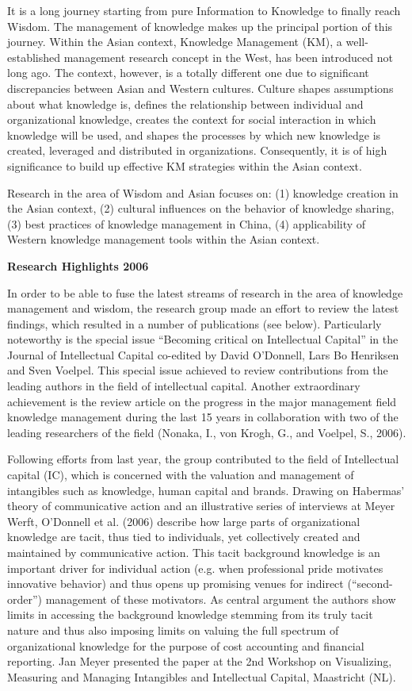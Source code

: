  It is a long journey starting from pure Information to Knowledge to finally reach Wisdom. The management of knowledge makes up the principal portion of this journey. Within the Asian context, Knowledge Management (KM), a well-established management research concept in the West, has been introduced not long ago. The context, however, is a totally different one due to significant discrepancies between Asian and Western cultures. Culture shapes assumptions about what knowledge is, defines the relationship between individual and organizational knowledge, creates the context for social interaction in which knowledge will be used, and shapes the processes by which new knowledge is created, leveraged and distributed in organizations. Consequently, it is of high significance to build up effective KM strategies within the Asian context.

 Research in the area of Wisdom and Asian focuses on: (1) knowledge creation in the Asian context, (2) cultural influences on the behavior of knowledge sharing, (3) best practices of knowledge management in China, (4) applicability of Western knowledge management tools within the Asian context.

\null
\textbf{Research Highlights 2006}

 In order to be able to fuse the latest streams of research in the area of knowledge management and wisdom, the research group made an effort to review the latest findings, which resulted in a number of publications (see below). Particularly noteworthy is the special issue ``Becoming critical on Intellectual Capital'' in the Journal of Intellectual Capital co-edited by David O'Donnell, Lars Bo Henriksen and Sven Voelpel. This special issue achieved to review contributions from the leading authors in the field of intellectual capital. Another extraordinary achievement is the review article on the progress in the major management field knowledge management during the last 15 years in collaboration with two of the leading researchers of the field (Nonaka, I., von Krogh, G., and Voelpel, S., 2006).

 Following efforts from last year, the group contributed to the field of Intellectual capital (IC), which is concerned with the valuation and management of intangibles such as knowledge, human capital and brands. Drawing on Habermas' theory of communicative action and an illustrative series of interviews at Meyer Werft, O'Donnell et al. (2006) describe how large parts of organizational knowledge are tacit, thus tied to individuals, yet collectively created and maintained by communicative action. This tacit background knowledge is an important driver for individual action (e.g. when professional pride motivates innovative behavior) and thus opens up promising venues for indirect (``second-order'') management of these motivators.  As central argument the authors show limits in accessing the background knowledge stemming from its truly tacit nature and thus also imposing limits on valuing the full spectrum of organizational knowledge for the purpose of cost accounting and financial reporting. Jan Meyer presented the paper at the 2nd Workshop on Visualizing, Measuring and Managing Intangibles and Intellectual Capital, Maastricht (NL).

